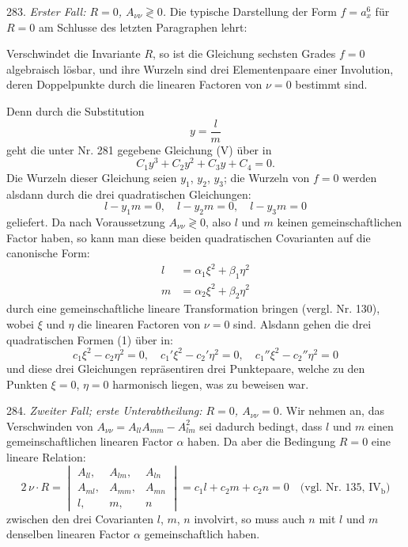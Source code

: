 \documentclass[11pt]{article}
\providecommand{\weberpage}[1]{}
\providecommand{\weq}[2]{\begin{equation}\tag{#1}#2\end{equation}}
\begin{document}
283. \textit{Erster Fall: $R=0$, $A_{\nu\nu}\gtrless 0$.} Die typische Darstellung der Form $f=a_x^6$ für $R=0$ am Schlusse des letzten Paragraphen lehrt:

\glqq Verschwindet die Invariante $R$, so ist die Gleichung sechsten Grades $f=0$ algebraisch lösbar, und ihre Wurzeln sind drei Elementenpaare einer Involution, deren Doppelpunkte durch die linearen Factoren von $\nu=0$ bestimmt sind.\grqq{}

Denn durch die Substitution
\[
y=\frac{l}{m}
\]
geht die unter Nr. 281 gegebene Gleichung (V) über in
\[
C_1y^3+C_2y^2+C_3y+C_4=0.
\]
Die Wurzeln dieser Gleichung seien $y_1$, $y_2$, $y_3$; die Wurzeln von $f=0$ werden alsdann durch die drei quadratischen Gleichungen:
\weq{1}{l-y_1m=0,\quad l-y_2m=0,\quad l-y_3m=0}
geliefert. Da nach Voraussetzung $A_{\nu\nu}\gtrless 0$, also $l$ und $m$ keinen gemeinschaftlichen Factor haben, so kann man diese beiden quadratischen Covarianten auf die canonische Form:
\[
\begin{aligned}
l&=\alpha_1\xi^2+\beta_1\eta^2\\
m&=\alpha_2\xi^2+\beta_2\eta^2
\end{aligned}
\]
durch eine gemeinschaftliche lineare Transformation bringen (vergl. Nr. 130), wobei $\xi$ und $\eta$ die linearen Factoren von $\nu=0$ sind. Alsdann gehen die drei quadratischen Formen (1) über in:
\[
c_1\xi^2-c_2\eta^2=0,\quad c_1'\xi^2-c_2'\eta^2=0,\quad c_1''\xi^2-c_2''\eta^2=0
\]
und diese drei Gleichungen repräsentiren drei Punktepaare, welche zu den Punkten $\xi=0$, $\eta=0$ harmonisch liegen, was zu beweisen war.


\weberpage{308}
284. \textit{Zweiter Fall; erste Unterabtheilung: $R=0$, $A_{\nu\nu}=0$.} Wir nehmen an, das Verschwinden von $A_{\nu\nu}=A_{ll}A_{mm}-A_{lm}^2$ sei dadurch bedingt, dass $l$ und $m$ einen gemeinschaftlichen linearen Factor $\alpha$ haben. Da aber die Bedingung $R=0$ eine lineare Relation:
\[
2\,\nu\cdot R=\begin{vmatrix}A_{ll}, & A_{lm}, & A_{ln}\\ A_{ml}, & A_{mm}, & A_{mn}\\ l, & m, & n\end{vmatrix}=c_1l+c_2m+c_2n=0%
\quad\text{(vgl. Nr. 135, IV$_{\text{b}}$)}
\]
zwischen den drei Covarianten $l$, $m$, $n$ involvirt, so muss auch $n$ mit $l$ und $m$ denselben linearen Factor $\alpha$ gemeinschaftlich haben.
\end{document}

